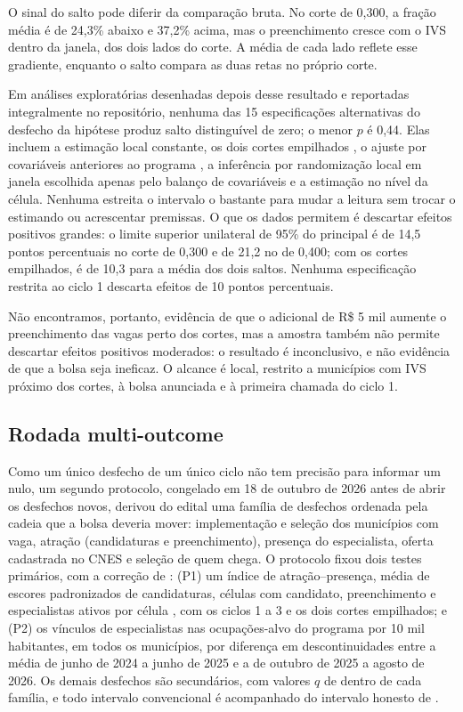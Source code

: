 \documentclass[11pt,a4paper]{article}
\begin{document}
O sinal do salto pode diferir da comparação bruta. No corte de 0,300, a fração
média é de 24,3\% abaixo e 37,2\% acima, mas o preenchimento cresce com o IVS
dentro da janela, dos dois lados do corte. A média de cada lado reflete esse
gradiente, enquanto o salto compara as duas retas no próprio corte.

Em análises exploratórias desenhadas depois desse resultado e reportadas
integralmente no repositório, nenhuma das 15 especificações alternativas do
desfecho da hipótese produz salto distinguível de zero; o menor $p$ é 0,44.
Elas incluem a estimação local constante, os dois cortes empilhados
\citep{cattaneo2016}, o ajuste por covariáveis anteriores ao programa
\citep{calonico2019}, a inferência por randomização local em janela escolhida
apenas pelo balanço de covariáveis \citep{cattaneo2015} e a estimação no nível
da célula. Nenhuma estreita o intervalo o bastante para mudar a leitura sem
trocar o estimando ou acrescentar premissas. O que os dados permitem é
descartar efeitos positivos grandes: o limite superior unilateral de 95\% do
principal é de 14,5 pontos percentuais no corte de 0,300 e de 21,2 no de
0,400; com os cortes empilhados, é de 10,3 para a média dos dois saltos.
Nenhuma especificação restrita ao ciclo 1 descarta efeitos de 10 pontos
percentuais.

Não encontramos, portanto, evidência de que o adicional de R\$ 5 mil aumente o
preenchimento das vagas perto dos cortes, mas a amostra também não permite
descartar efeitos positivos moderados: o resultado é inconclusivo, e não
evidência de que a bolsa seja ineficaz. O alcance é local, restrito a
municípios com IVS próximo dos cortes, à bolsa anunciada e à primeira chamada
do ciclo 1.

\subsection{Rodada multi-outcome}
\label{sec:bolsa_multi}

Como um único desfecho de um único ciclo não tem precisão para informar um
nulo, um segundo protocolo, congelado em 18 de outubro de 2026 antes de abrir
os desfechos novos, derivou do edital uma família de desfechos ordenada pela
cadeia que a bolsa deveria mover: implementação e seleção dos municípios com
vaga, atração (candidaturas e preenchimento), presença do especialista, oferta
cadastrada no CNES e seleção de quem chega. O protocolo fixou dois testes
primários, com a correção de \citet{holm1979}: (P1) um índice de
atração--presença, média de escores padronizados de candidaturas, células com
candidato, preenchimento e especialistas ativos por célula \citep{kling2007},
com os ciclos 1 a 3 e os dois cortes empilhados; e (P2) os vínculos de especialistas nas ocupações-alvo do programa
por 10 mil habitantes, em todos os municípios, por diferença em
descontinuidades \citep{grembi2016} entre a média de junho de 2024 a junho de
2025 e a de outubro de 2025 a agosto de 2026. Os demais desfechos são
secundários, com valores $q$ de \citet{benjamini2006} dentro de cada família, e
todo intervalo convencional é acompanhado do intervalo honesto de
\citet{armstrong2018,armstrong2020}.
\end{document}
